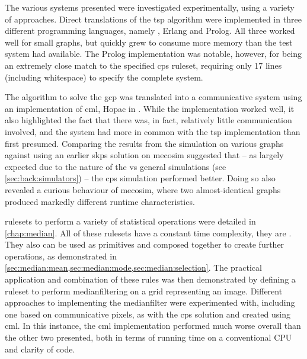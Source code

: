 The various systems presented were investigated experimentally, using a variety of approaches.  Direct translations of the \gls{tsp} algorithm were implemented in three different programming languages, namely \fsharp{}, Erlang and Prolog.  All three worked well for small graphs, but quickly grew to consume more memory than the test system had available.  The Prolog implementation was notable, however, for being an extremely close match to the specified \gls{cps} \gls{ruleset}, requiring only 17 lines (including whitespace) to specify the complete system.

The algorithm to solve the \gls{gcp} was translated into a communicative system using an implementation of \gls{cml}, Hopac in \fsharp{}.  While the implementation worked well, it also highlighted the fact that there was, in fact, relatively little communication involved, and the system had more in common with the \gls{tsp} implementation than first presumed.  Comparing the results from the simulation on various graphs against using an earlier \gls{skps} solution on \gls{mecosim} suggested that -- as largely expected due to the nature of the \adhoc{} vs general simulations (see \vref{sec:back:simulators}) -- the \gls{cps} simulation performed better.  Doing so also revealed a curious behaviour of \gls{mecosim}, where two almost-identical graphs produced markedly different runtime characteristics.


\Glspl{ruleset} to perform a variety of statistical operations were detailed in \cref{chap:median}.  All of these rulesets have a constant time complexity, \ie{} they are .  They also can be used as primitives and composed together to create further operations, as demonstrated in \eg{} \cref{sec:median:mean,sec:median:mode,sec:median:selection}.  The practical application and combination of these rules was then demonstrated by defining a ruleset to perform \gls{medianfilter}ing on a grid representing an image.  Different approaches to implementing the \gls{medianfilter} were experimented with, including one based on communicative pixels, as with the \gls{cps} solution and created using \gls{cml}.  In this instance, the \gls{cml} implementation performed much worse overall than the other two presented, both in terms of running time on a conventional CPU and clarity of code.

